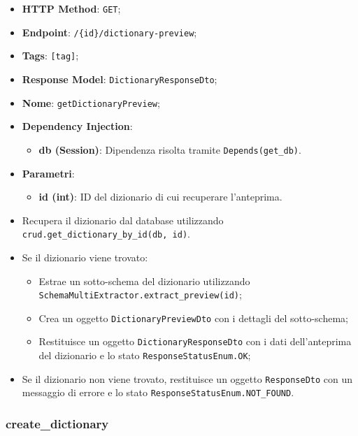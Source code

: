 \begin{itemize}
\item \textbf{HTTP Method}: \texttt{GET};
\item \textbf{Endpoint}: \texttt{/\{id\}/dictionary-preview};
\item \textbf{Tags}: \texttt{[tag]};
\item \textbf{Response Model}: \texttt{DictionaryResponseDto};
\item \textbf{Nome}: \texttt{getDictionaryPreview};
\item \textbf{Dependency Injection}:
\begin{itemize}
\item \textbf{db (Session)}: Dipendenza risolta tramite \texttt{Depends(get\_db)}.
\end{itemize}
\item \textbf{Parametri}:
\begin{itemize}
\item \textbf{id (int)}: ID del dizionario di cui recuperare l'anteprima.
\end{itemize}
\end{itemize}

\begin{itemize}
\item Recupera il dizionario dal database utilizzando \texttt{crud.get\_dictionary\_by\_id(db, id)}.
\item Se il dizionario viene trovato:
\begin{itemize}
\item Estrae un sotto-schema del dizionario utilizzando \texttt{SchemaMultiExtractor\-.\-extract\_preview(id)};
\item Crea un oggetto \texttt{DictionaryPreviewDto} con i dettagli del sotto-schema;
\item Restituisce un oggetto \texttt{DictionaryResponseDto} con i dati dell'anteprima del dizionario e lo stato \texttt{ResponseStatusEnum.OK};
\end{itemize}
\item Se il dizionario non viene trovato, restituisce un oggetto \texttt{ResponseDto} con un messaggio di errore e lo stato \texttt{ResponseStatusEnum.NOT\_FOUND}.
\end{itemize}

\subsubsection{create\_dictionary}

